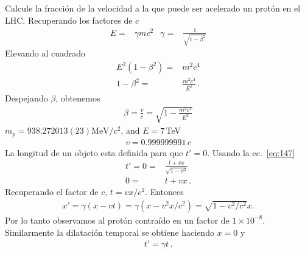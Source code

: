 \begin{frame}
\begin{example}
  Calcule la fracción de la velocidad a la que puede ser acelerado un protón en el LHC.
Recuperando los factores de $c$
  \begin{align*}
  E=&\gamma m c^2&  \gamma=&\frac{1}{\sqrt{1-\beta^2}}
\end{align*}
Elevando al cuadrado
\begin{align}
  E^2(1-\beta^2)=&m^2c^4 \nonumber\\
1-\beta^2=&\frac{m^2c^4}{E^2}\,.
\end{align}
Despejando $\beta$, obtenemos
\begin{align*}
  \beta=\frac{v}{c}=\sqrt{1-\frac{m^2 c^4}{E^2}}
\end{align*}
$m_p=938.272013(23) {\text{MeV}}/{c^2}$, and $E=7\,$TeV
\begin{align*}
  v=0.999999991\,c
\end{align*}
La longitud de un objeto esta definida para que $t'=0$. Usando la ec.~\eqref{eq:147} 
\begin{align}
  t'=0=&\frac{t+vx}{\sqrt{1-v^2}} \nonumber\\
     0=&t+vx\,.
\end{align}
Recuperando el factor de $c$,
 $t=v x/c^2$. Entonces
\begin{align}
  x'=\gamma(x-v t)=\gamma(x-v^2 x/c^2)=\sqrt{1-v^2/c^2}x.
\end{align}
Por lo tanto observamos al protón contraído en un factor de $1\times10^{-8}$.  Similarmente la dilatación temporal se obtiene haciendo $x=0$ y
\begin{align}
  t'=\gamma t\,.
\end{align}
\end{example}

\end{frame}

